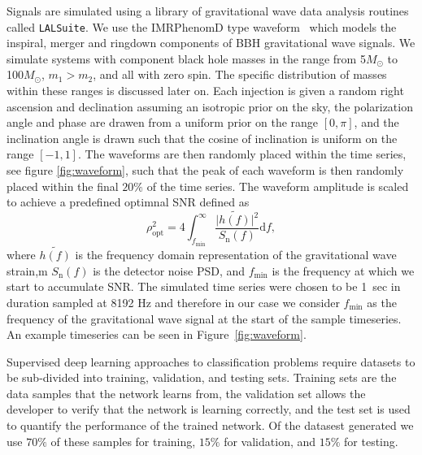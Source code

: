 \documentclass[%
 amsmath,amssymb,
 aps,
 twocolumn,
 prl,
 reprint,
floatfix,
]{revtex4-1}
\begin{document}
%
%
Signals are simulated using a library of gravitational wave data analysis
routines called \texttt{LALSuite}. We use the IMRPhenomD type
waveform~\cite{PhysRevD.93.044006, PhysRevD.93.044007} which models the
inspiral, merger and ringdown components of \ac{BBH} gravitational wave
signals. We simulate systems with component black hole masses in the range from
5\(M_\odot\) to 100\(M_\odot\), $m_{1} > m_{2}$, and all with zero spin. The
specific distribution of masses within these ranges is discussed later on. Each
injection is given a random right ascension and declination assuming an
isotropic prior on the sky, the polarization angle and phase are drawen from a
uniform prior on the range $[0,\pi]$, and the inclination angle is drawn such
that the cosine of inclination is uniform on the range $[-1,1]$. The waveforms
are then randomly placed within the time series, see figure \ref{fig:waveform},
such that the peak of each waveform is then randomly placed within the final $ 20\% $ of the time series. The waveform amplitude is scaled to achieve a predefined optimnal
\ac{SNR} defined as
%
%
\begin{equation} \label{eq:snr} \rho_{\mathrm{opt}}^{2} = 4
\int_{f_{\mathrm{min}}}^{\infty} \frac{\lvert
\tilde{h(f)}\rvert^{2}}{S_{\mathrm{n}}(f)} \mathrm{d}f, \end{equation}
%
where $\tilde{h(f)}$ is the frequency domain representation of the
gravitational wave strain,m $S_{\mathrm{n}}(f)$ is the detector noise \ac{PSD},
and $f_{\mathrm{min}}$ is the frequency at which we start to accumulate
\ac{SNR}. The simulated time series were chosen to be 1~sec in duration sampled
at 8192 Hz and therefore in our case we consider $f_{\mathrm{min}}$ as the
frequency of the gravitational wave signal at the start of the sample
timeseries. An example timeseries can be seen in Figure~\ref{fig:waveform}. 

%
%
Supervised deep learning approaches to classification problems require
datasets to be sub-divided into training, validation, and testing sets.
Training sets are the data samples that the network learns from, the validation
set allows the developer to verify that the network is learning correctly, and
the test set is used to quantify the performance of the trained network.
Of the datasest generated we use $70\%$ of these samples for training,
$15\%$ for validation, and $15\%$ for testing.
\end{document}
